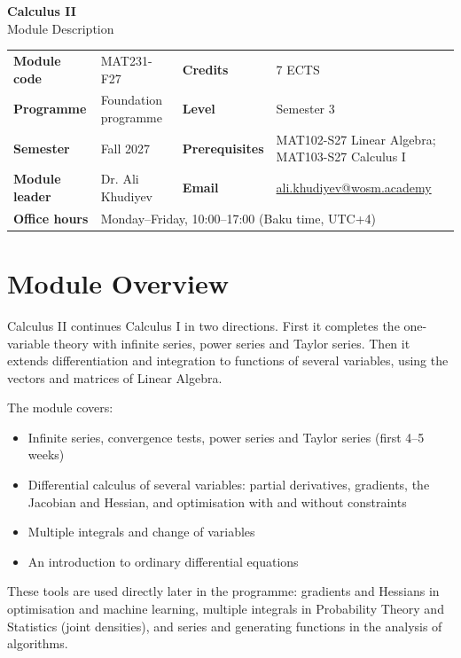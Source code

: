 \documentclass[11pt,a4paper]{article}
\makeatletter
\newcommand{\ModuleTitle}{Calculus II}
\newcommand{\ModuleCode}{MAT231-F27}
\newcommand{\Programme}{Foundation programme}
\newcommand{\Level}{Semester 3}
\newcommand{\Semester}{Fall 2027}
\newcommand{\Credits}{7 ECTS}
\newcommand{\ModuleLeader}{Dr. Ali Khudiyev}
\newcommand{\Email}{ali.khudiyev@wosm.academy}
\newcommand{\OfficeHours}{Monday--Friday, 10:00--17:00 (Baku time, UTC+4)}
\newcommand{\Prerequisites}{MAT102-S27 Linear Algebra; MAT103-S27 Calculus I}
\makeatother
\begin{document}
\begin{center}
  {\LARGE\bfseries\color{accent} \ModuleTitle}\\[4pt]
  {\large Module Description}
\end{center}
\vspace{6pt}

\begin{tabularx}{\textwidth}{>{\bfseries}l X >{\bfseries}l X}
\toprule
Module code   & \ModuleCode    & Credits      & \Credits \\
Programme     & \Programme     & Level        & \Level \\
Semester      & \Semester      & Prerequisites & \Prerequisites \\
Module leader & \ModuleLeader  & Email        & \href{mailto:\Email}{\Email} \\
Office hours  & \multicolumn{3}{l}{\OfficeHours} \\
\bottomrule
\end{tabularx}

\section{Module Overview}
Calculus II continues Calculus I in two directions. First it completes the
one-variable theory with infinite series, power series and Taylor series. Then it
extends differentiation and integration to functions of several variables, using
the vectors and matrices of Linear Algebra.

The module covers:
\begin{itemize}
  \item Infinite series, convergence tests, power series and Taylor series
        (first 4--5 weeks)
  \item Differential calculus of several variables: partial derivatives, gradients,
        the Jacobian and Hessian, and optimisation with and without constraints
  \item Multiple integrals and change of variables
  \item An introduction to ordinary differential equations
\end{itemize}

These tools are used directly later in the programme: gradients and Hessians in
optimisation and machine learning, multiple integrals in Probability Theory and
Statistics (joint densities), and series and generating functions in the analysis
of algorithms.
\end{document}
